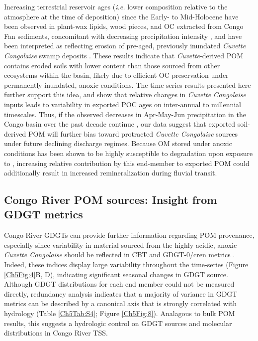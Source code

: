 Increasing terrestrial reservoir ages (\textit{i.e.} lower  composition relative to the atmosphere at the time of deposition) since the Early- to Mid-Holocene have been observed in plant-wax lipids, wood pieces, and OC extracted from Congo Fan sediments, concomitant with decreasing precipitation intensity \citep{Schefuss:2005jo}, and have been interpreted as reflecting erosion of pre-aged, previously inundated \textit{Cuvette Congolaise} swamp deposits \citep{Schefuss:2016cp}. These results indicate that \textit{Cuvette}-derived POM contains eroded soils with lower  content than those sourced from other ecosystems within the basin, likely due to efficient OC preservation under permanently inundated, anoxic conditions. The time-series  results presented here further support this idea, and show that relative changes in \textit{Cuvette Congolaise} inputs leads to variability in exported POC ages on inter-annual to millennial timescales. Thus, if the observed decreases in Apr-May-Jun precipitation in the Congo basin over the past decade continue \citep{Zhou:2014gl}, our data suggest that exported soil-derived POM will further bias toward protracted \textit{Cuvette Congolaise} sources under future declining discharge regimes. Because OM stored under anoxic conditions has been shown to be highly susceptible to degradation upon exposure to  \citep{Fenner:2011cu,Hirano:2012jz}, increasing relative contribution by this end-member to exported POM could additionally result in increased remineralization during fluvial transit.

\subsection{Congo River POM sources: Insight from GDGT metrics}

Congo River GDGTs can provide further information regarding POM provenance, especially since variability in material sourced from the highly acidic, anoxic \textit{Cuvette Congolaise} \citep{Mann:2014jx} should be reflected in CBT and GDGT-0/cren metrics \citep{Blaga:2009ge,Peterse:2012bs}. Indeed, these indices display large variability throughout the time-series (Figure \ref{Ch5Fig:4}B, D), indicating significant seasonal changes in GDGT source. Although GDGT distributions for each end member could not be measured directly, redundancy analysis \citep[RDA;][]{Legendre:1998tt} indicates that a majority of variance in GDGT metrics can be described by a canonical axis that is strongly correlated with hydrology (Table \ref{Ch5Tab:S4}; Figure \ref{Ch5Fig:8}). Analagous to bulk POM results, this suggests a hydrologic control on GDGT sources and molecular distributions in Congo River TSS. 

